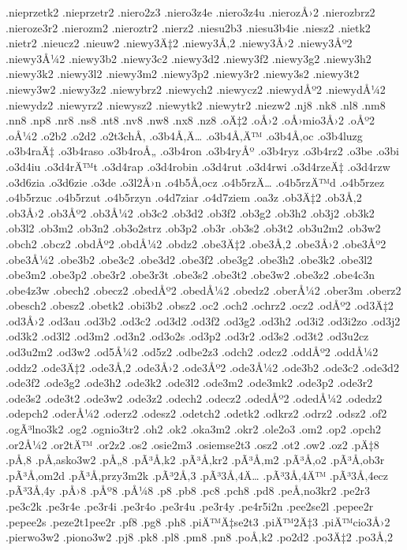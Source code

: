 {.nieprzetk2
.nieprzetr2
.niero2z3
.niero3z4e
.niero3z4u
.nierozÅ›2
.nierozbrz2
.nieroze3r2
.nierozm2
.nieroztr2
.nierz2
.niesu2b3
.niesu3b4ie
.niesz2
.nietk2
.nietr2
.nieucz2
.nieuw2
.niewy3Ä‡2
.niewy3Å‚2
.niewy3Å›2
.niewy3Åº2
.niewy3Å¼2
.niewy3b2
.niewy3c2
.niewy3d2
.niewy3f2
.niewy3g2
.niewy3h2
.niewy3k2
.niewy3l2
.niewy3m2
.niewy3p2
.niewy3r2
.niewy3s2
.niewy3t2
.niewy3w2
.niewy3z2
.niewybrz2
.niewych2
.niewycz2
.niewydÅº2
.niewydÅ¼2
.niewydz2
.niewyrz2
.niewysz2
.niewytk2
.niewytr2
.niezw2
.nj8
.nk8
.nl8
.nm8
.nn8
.np8
.nr8
.ns8
.nt8
.nv8
.nw8
.nx8
.nz8
.oÄ‡2
.oÅ›2
.oÅ›mio3Å›2
.oÅº2
.oÅ¼2
.o2b2
.o2d2
.o2t3chÅ‚
.o3b4Å‚Ä…
.o3b4Å‚Ä™
.o3b4Å‚oc
.o3b4luzg
.o3b4raÄ‡
.o3b4raso
.o3b4roÅ„
.o3b4ron
.o3b4ryÅº
.o3b4ryz
.o3b4rz2
.o3be
.o3bi
.o3d4iu
.o3d4rÄ™t
.o3d4rap
.o3d4robin
.o3d4rut
.o3d4rwi
.o3d4rzeÄ‡
.o3d4rzw
.o3d6zia
.o3d6zie
.o3de
.o3l2Å›n
.o4b5Å‚ocz
.o4b5rzÄ…
.o4b5rzÄ™d
.o4b5rzez
.o4b5rzuc
.o4b5rzut
.o4b5rzyn
.o4d7ziar
.o4d7ziem
.oa3z
.ob3Ä‡2
.ob3Å‚2
.ob3Å›2
.ob3Åº2
.ob3Å¼2
.ob3c2
.ob3d2
.ob3f2
.ob3g2
.ob3h2
.ob3j2
.ob3k2
.ob3l2
.ob3m2
.ob3n2
.ob3o2strz
.ob3p2
.ob3r
.ob3s2
.ob3t2
.ob3u2m2
.ob3w2
.obch2
.obcz2
.obdÅº2
.obdÅ¼2
.obdz2
.obe3Ä‡2
.obe3Å‚2
.obe3Å›2
.obe3Åº2
.obe3Å¼2
.obe3b2
.obe3c2
.obe3d2
.obe3f2
.obe3g2
.obe3h2
.obe3k2
.obe3l2
.obe3m2
.obe3p2
.obe3r2
.obe3r3t
.obe3s2
.obe3t2
.obe3w2
.obe3z2
.obe4c3n
.obe4z3w
.obech2
.obecz2
.obedÅº2
.obedÅ¼2
.obedz2
.oberÅ¼2
.ober3m
.oberz2
.obesch2
.obesz2
.obetk2
.obi3b2
.obsz2
.oc2
.och2
.ochrz2
.ocz2
.odÅº2
.od3Ä‡2
.od3Å›2
.od3au
.od3b2
.od3c2
.od3d2
.od3f2
.od3g2
.od3h2
.od3i2
.od3i2zo
.od3j2
.od3k2
.od3l2
.od3m2
.od3n2
.od3o2s
.od3p2
.od3r2
.od3s2
.od3t2
.od3u2cz
.od3u2m2
.od3w2
.od5Å¼2
.od5z2
.odbe2z3
.odch2
.odcz2
.oddÅº2
.oddÅ¼2
.oddz2
.ode3Ä‡2
.ode3Å‚2
.ode3Å›2
.ode3Åº2
.ode3Å¼2
.ode3b2
.ode3c2
.ode3d2
.ode3f2
.ode3g2
.ode3h2
.ode3k2
.ode3l2
.ode3m2
.ode3mk2
.ode3p2
.ode3r2
.ode3s2
.ode3t2
.ode3w2
.ode3z2
.odech2
.odecz2
.odedÅº2
.odedÅ¼2
.odedz2
.odepch2
.oderÅ¼2
.oderz2
.odesz2
.odetch2
.odetk2
.odkrz2
.odrz2
.odsz2
.of2
.ogÃ³lno3k2
.og2
.ognio3tr2
.oh2
.ok2
.oka3m2
.okr2
.ole2o3
.om2
.op2
.opch2
.or2Å¼2
.or2tÄ™
.or2z2
.os2
.osie2m3
.osiemse2t3
.osz2
.ot2
.ow2
.oz2
.pÄ‡8
.pÅ‚8
.pÅ‚asko3w2
.pÅ„8
.pÃ³Å‚k2
.pÃ³Å‚kr2
.pÃ³Å‚m2
.pÃ³Å‚o2
.pÃ³Å‚ob3r
.pÃ³Å‚om2d
.pÃ³Å‚przy3m2k
.pÃ³2Å‚3
.pÃ³3Å‚4Ä…
.pÃ³3Å‚4Ä™
.pÃ³3Å‚4ecz
.pÃ³3Å‚4y
.pÅ›8
.pÅº8
.pÅ¼8
.p8
.pb8
.pc8
.pch8
.pd8
.peÅ‚no3kr2
.pe2r3
.pe3c2k
.pe3r4e
.pe3r4i
.pe3r4o
.pe3r4u
.pe3r4y
.pe4r5i2n
.pee2se2l
.pepee2r
.pepee2s
.peze2t1pee2r
.pf8
.pg8
.ph8
.piÄ™Ä‡se2t3
.piÄ™2Ä‡3
.piÄ™cio3Å›2
.pierwo3w2
.piono3w2
.pj8
.pk8
.pl8
.pm8
.pn8
.poÅ‚k2
.po2d2
.po3Ä‡2
.po3Å‚2
}
